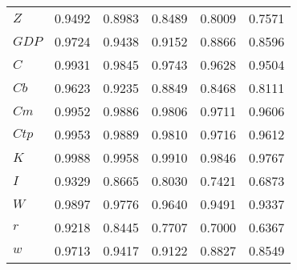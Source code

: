 \begin{center}
\begin{longtable}{lccccc}
$Z         $	 & 	    0.9492	 & 	    0.8983	 & 	    0.8489	 & 	    0.8009	 & 	    0.7571 \\ 
$GDP       $	 & 	    0.9724	 & 	    0.9438	 & 	    0.9152	 & 	    0.8866	 & 	    0.8596 \\ 
$C         $	 & 	    0.9931	 & 	    0.9845	 & 	    0.9743	 & 	    0.9628	 & 	    0.9504 \\ 
$Cb        $	 & 	    0.9623	 & 	    0.9235	 & 	    0.8849	 & 	    0.8468	 & 	    0.8111 \\ 
$Cm        $	 & 	    0.9952	 & 	    0.9886	 & 	    0.9806	 & 	    0.9711	 & 	    0.9606 \\ 
$Ctp       $	 & 	    0.9953	 & 	    0.9889	 & 	    0.9810	 & 	    0.9716	 & 	    0.9612 \\ 
$K         $	 & 	    0.9988	 & 	    0.9958	 & 	    0.9910	 & 	    0.9846	 & 	    0.9767 \\ 
$I         $	 & 	    0.9329	 & 	    0.8665	 & 	    0.8030	 & 	    0.7421	 & 	    0.6873 \\ 
$W         $	 & 	    0.9897	 & 	    0.9776	 & 	    0.9640	 & 	    0.9491	 & 	    0.9337 \\ 
$r         $	 & 	    0.9218	 & 	    0.8445	 & 	    0.7707	 & 	    0.7000	 & 	    0.6367 \\ 
$w         $	 & 	    0.9713	 & 	    0.9417	 & 	    0.9122	 & 	    0.8827	 & 	    0.8549 \\ 
\end{longtable}
 \end{center}
